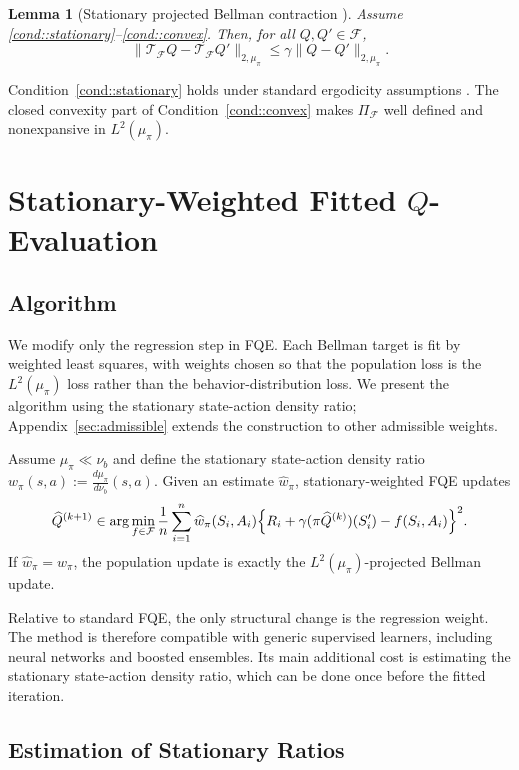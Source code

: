 \documentclass{article}
\theoremstyle{plain}
\newtheorem{lemma}{Lemma}
\theoremstyle{definition}
\theoremstyle{remark}
\begin{document}
\begin{lemma}[Stationary projected Bellman contraction \citep{tsitsiklis1996analysis}]
\label{lem:bellman-contraction}
Assume \ref{cond::stationary}--\ref{cond::convex}. Then, for all
\(Q,Q'\in\mathcal F\),
\[
\|\mathcal T_{\mathcal F}Q-\mathcal T_{\mathcal F}Q'\|_{2,\mu_\pi}
\le
\gamma\|Q-Q'\|_{2,\mu_\pi}.
\]
\end{lemma}

Condition~\ref{cond::stationary} holds under standard ergodicity assumptions
\citep{puterman1990markov}. The closed convexity part of
Condition~\ref{cond::convex} makes \(\Pi_{\mathcal F}\) well defined and
nonexpansive in \(L^2(\mu_\pi)\).

\section{Stationary-Weighted Fitted \(Q\)-Evaluation}

\subsection{Algorithm}

We modify only the regression step in FQE. Each Bellman target is fit by weighted
least squares, with weights chosen so that the population loss is the
\(L^2(\mu_\pi)\) loss rather than the behavior-distribution loss. We present the
algorithm using the stationary state-action density ratio; Appendix~\ref{sec:admissible}
extends the construction to other admissible weights.

Assume \(\mu_\pi \ll \nu_b\) and define the stationary state-action density ratio $w_\pi(s,a) := \frac{d\mu_\pi}{d\nu_b}(s,a).$
Given an estimate \(\widehat w_\pi\), stationary-weighted FQE updates
\[
\widehat Q^{(k+1)}
\in
\arg\min_{f \in \mathcal F}
\frac{1}{n}\sum_{i=1}^{n} \widehat w_\pi(S_i,A_i)
\Bigl\{
R_i + \gamma(\pi \widehat Q^{(k)})(S_i') - f(S_i,A_i)
\Bigr\}^2 .
\]
If \(\widehat w_\pi=w_\pi\), the population update is exactly the
\(L^2(\mu_\pi)\)-projected Bellman update.

Relative to standard FQE,
the only structural change is the regression weight. The method is therefore
compatible with generic supervised learners, including neural networks and
boosted ensembles. Its main additional cost is estimating the stationary
state-action density ratio, which can be done once before the fitted iteration.

 \subsection{Estimation of Stationary Ratios}
\label{sec:ratio-estimation}
\end{document}
